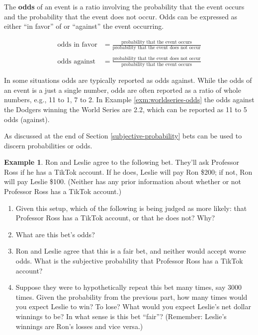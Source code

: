 \documentclass[
]{book}
\providecommand{\tightlist}{%
  \setlength{\itemsep}{0pt}\setlength{\parskip}{0pt}}
\theoremstyle{definition}
\theoremstyle{definition}
\newtheorem{example}{Example}[chapter]
\theoremstyle{definition}
\theoremstyle{remark}
\begin{document}
The \textbf{odds} of an event is a ratio involving the probability that the
event occurs and the probability that the event does not occur. Odds can be expressed as either ``in favor'' of or ``against'' the event occurring.

\[
\begin{aligned}
\text{odds in favor} & = \frac{\text{probability that the event occurs}}{\text{probability that the event does not occur}} \\
& \\
\text{odds against} & = \frac{\text{probability that the event does not occur}}{\text{probability that the event occurs}}\end{aligned}
\]

In some situations odds are typically reported as odds against. While the odds of an event is a just a single number, odds are often reported as a ratio of whole numbers, e.g., 11 to 1, 7 to 2. In Example \ref{exm:worldseries-odds} the odds against the Dodgers winning the World Series are 2.2, which can be reported as 11 to 5 odds (against).

As discussed at the end of Section \ref{subjective-probability} bets can be used to discern probabilities or odds.

\begin{example}
\protect\hypertarget{exm:bet-EV}{}{\label{exm:bet-EV} }
Ron and Leslie agree to the following bet. They'll ask Professor Ross if he has a TikTok account. If he does, Leslie will pay
Ron \$200; if not, Ron will pay Leslie \$100. (Neither has any prior information about whether or not Professor Ross has a TikTok account.)

\begin{enumerate}
\def\labelenumi{\arabic{enumi}.}
\tightlist
\item
  Given this setup, which of the following is being judged as more likely: that Professor Ross has a TikTok account, or that he does not? Why?
\item
  What are this bet's odds?
\item
  Ron and Leslie agree that this is a fair bet, and neither would accept worse odds. What is the subjective probability that Professor Ross has a TikTok account?
\item
  Suppose they were to hypothetically repeat this bet many times, say 3000 times. Given the probability from the previous part, how many times would you expect Leslie to win? To lose? What would you expect Leslie's net dollar winnings to be? In what sense is this bet ``fair''? (Remember: Leslie's winnings are Ron's losses and vice versa.)
\end{enumerate}
\end{example}
\end{document}
